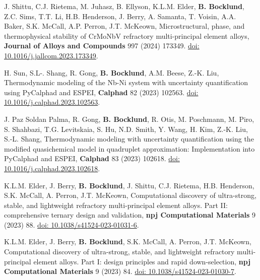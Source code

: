 \item J. Shittu, C.J. Rietema, M. Juhasz, B. Ellyson, K.L.M. Elder, \textbf{B. Bocklund}, Z.C. Sims, T.T. Li, H.B. Henderson, J. Berry, A. Samanta, T. Voisin, A.A. Baker, S.K. McCall, A.P. Perron, J.T. McKeown,
Microstructural, phase, and thermophysical stability of CrMoNbV refractory multi-principal element alloys,
  \textbf{Journal of Alloys and Compounds} 997 (2024) 173349.
  \href{https://doi.org/10.1016/j.jallcom.2023.173349}{doi: 10.1016/j.jallcom.2023.173349}.

\item H. Sun, S.L-. Shang, R. Gong, \textbf{B. Bocklund}, A.M. Beese, Z.-K. Liu,
Thermodynamic modeling of the Nb-Ni system with uncertainty quantification using PyCalphad and ESPEI,
  \textbf{Calphad} 82 (2023) 102563.
  \href{https://doi.org/10.1016/j.calphad.2023.102563}{doi: 10.1016/j.calphad.2023.102563}.

\item J. Paz Soldan Palma, R. Gong, \textbf{B. Bocklund}, R. Otis, M. Poschmann, M. Piro, S. Shahbazi, T.G. Levitskaia, S. Hu, N.D. Smith, Y. Wang, H. Kim, Z.-K. Liu, S.-L. Shang,
Thermodynamic modeling with uncertainty quantification using the modified quasichemical model in quadruplet approximation: Implementation into PyCalphad and ESPEI,
  \textbf{Calphad} 83 (2023) 102618.
  \href{https://doi.org/10.1016/j.calphad.2023.102618}{doi: 10.1016/j.calphad.2023.102618}.

\item K.L.M. Elder, J. Berry, \textbf{B. Bocklund}, J. Shittu, C.J. Rietema, H.B. Henderson, S.K. McCall, A. Perron, J.T. McKeown,
Computational discovery of ultra-strong, stable, and lightweight refractory multi-principal element alloys. Part II: comprehensive ternary design and validation,
  \textbf{npj Computational Materials} 9 (2023) 88.
  \href{https://doi.org/10.1038/s41524-023-01031-6}{doi: 10.1038/s41524-023-01031-6}.

\item \label{paper-award} K.L.M. Elder, J. Berry, \textbf{B. Bocklund}, S.K. McCall, A. Perron, J.T. McKeown,
Computational discovery of ultra-strong, stable, and lightweight refractory multi-principal element alloys. Part I: design principles and rapid down-selection,
  \textbf{npj Computational Materials} 9 (2023) 84.
  \href{https://doi.org/10.1038/s41524-023-01030-7}{doi: 10.1038/s41524-023-01030-7}.


